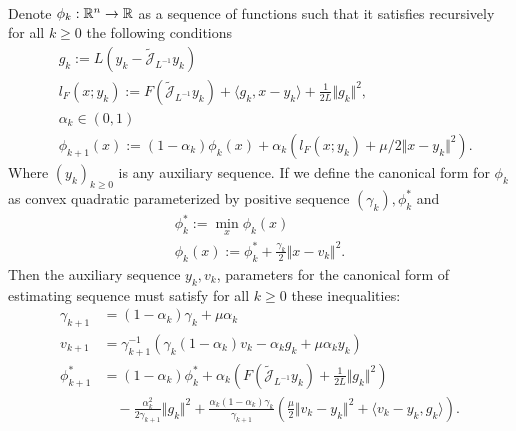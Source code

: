 \documentclass[12pt]{article}
\begin{document}
    \begin{theorem}\label{thm:canon-prox-grad-est-seq}
        \; \\
        Denote $\phi_k:\mathbb R^n \rightarrow\mathbb R$ as a sequence of functions such that it satisfies recursively for all $k\ge 0$ the following conditions 
        \begin{align*}
            & g_k := L(y_k - \widetilde{\mathcal J}_{L^{-1}} y_k)
            \\
            & l_F(x; y_k) := 
                F\left(\widetilde{\mathcal J}_{L^{-1}} y_k\right) 
                + \langle g_k, x - y_k\rangle 
                + \frac{1}{2L}\Vert g_k\Vert^2, 
            \\
            & \alpha_k \in (0, 1)
            \\
            & 
            \phi_{k + 1}(x)
            := (1 - \alpha_k)\phi_k (x) + 
            \alpha_k (l_F(x; y_k) + \mu/2\Vert x - y_k\Vert^2). 
        \end{align*}
        Where $(y_k)_{k\ge 0}$ is any auxiliary sequence. 
        If we define the canonical form for $\phi_k$ as convex quadratic parameterized by positive sequence $(\gamma_k), \phi_k^*$ and 
        \begin{align*}
            \phi_k^* := \min_{x} \phi_k(x)
            \\
            \phi_k(x) := \phi_k^* + \frac{\gamma_k}{2}\Vert x - v_k\Vert^2.
        \end{align*}
        Then the auxiliary sequence $y_k, v_k$, parameters for the canonical form of estimating sequence must satisfy for all $k\ge 0$ these inequalities: 
        {\small
        \begin{align*}      
            \gamma_{k + 1} &= (1 - \alpha_k) \gamma_k + \mu \alpha_k
            \\
            v_{k + 1} &= \gamma_{k + 1}^{-1}
            (\gamma_k(1 - \alpha_k)v_k - \alpha_k g_k + \mu \alpha_k y_k)
            \\
            \phi_{k + 1}^* &= 
            (1 - \alpha_k)\phi_k^*
            + \alpha_k\left(
                F\left(\widetilde{\mathcal J}_{L^{-1}} y_k\right) 
                + \frac{1}{2L}\Vert g_k\Vert^2 
            \right) 
            \\
            &\quad 
            - \frac{\alpha_k^2}{2 \gamma_{k + 1}} \Vert g_k\Vert^2 
            + 
            \frac{\alpha_k(1 - \alpha_k)\gamma_k}{\gamma_{k + 1}} 
            \left(
                \frac{\mu}{2}\Vert v_k - y_k\Vert^2 
                + \langle v_k - y_k , g_k\rangle
            \right). 
        \end{align*}
        }
    \end{theorem}
    
\end{document}

